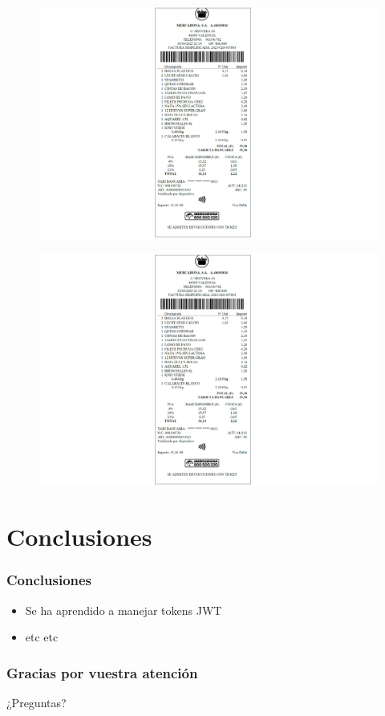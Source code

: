 \documentclass{beamer}
\begin{document}
	\begin{frame}
		\begin{figure}
			\centering
			\includegraphics[width=1\linewidth]{imgEspecifiques/ticketExtraccioA.png}
			\label{fig:ticketExtraccioA}
		\end{figure}
	\end{frame}
	
	
		
	\begin{frame}
		\begin{figure}
			\centering
			\includegraphics[width=1\linewidth]{imgEspecifiques/ticketExtraccioB.png}
			\label{fig:ticketExtraccioB}
		\end{figure}
	\end{frame}
	
	
	
	\section{Conclusiones}
	
	\begin{frame}
		\frametitle{Conclusiones}
		\begin{itemize}
			\item Se ha aprendido a manejar tokens JWT
			\item etc etc
		\end{itemize}
	\end{frame}
	
	\begin{frame}
		\frametitle{Gracias por vuestra atención}
		¿Preguntas?
	\end{frame}
	
\end{document}
